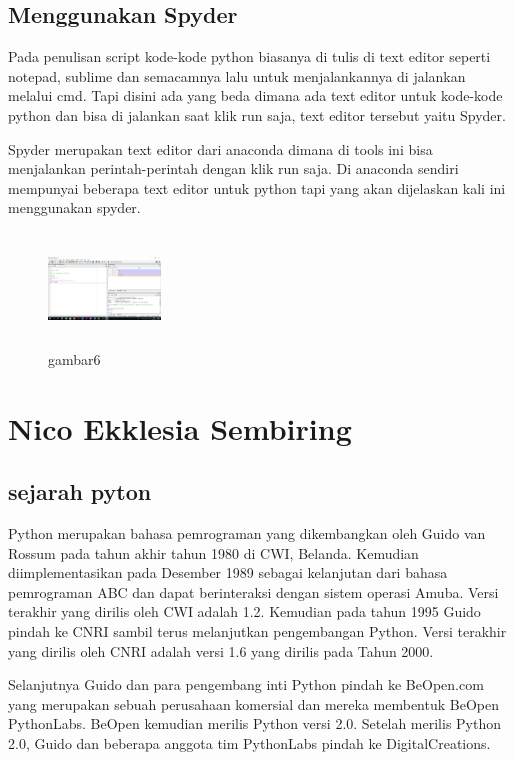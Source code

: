 \subsection{Menggunakan Spyder}
Pada penulisan script kode-kode python biasanya di tulis di text editor seperti notepad, sublime dan semacamnya lalu untuk menjalankannya di jalankan melalui cmd. Tapi disini ada yang beda dimana ada text editor untuk kode-kode python dan bisa di jalankan saat klik run saja, text editor tersebut yaitu Spyder.
\par Spyder merupakan text editor dari anaconda dimana di tools ini bisa menjalankan perintah-perintah dengan klik run saja. Di anaconda sendiri mempunyai beberapa text editor untuk python tapi yang akan dijelaskan kali ini menggunakan spyder.
\begin{figure}[!htbp]
    \centering
    \includegraphics[width=3cm,height=3cm]{figures/choi/6.png}
    \caption{gambar6}
    \label{spyder}
    \end{figure}
	



\section{Nico Ekklesia Sembiring}
\subsection{sejarah pyton}
Python merupakan bahasa pemrograman yang dikembangkan oleh Guido van Rossum pada tahun akhir tahun 1980 di CWI, Belanda. Kemudian diimplementasikan pada Desember 1989 sebagai kelanjutan dari bahasa pemrograman ABC dan dapat berinteraksi dengan sistem operasi Amuba. Versi terakhir yang dirilis oleh CWI adalah 1.2. Kemudian pada tahun 1995 Guido pindah ke CNRI sambil terus melanjutkan pengembangan Python. Versi terakhir yang dirilis oleh CNRI adalah versi 1.6 yang dirilis pada Tahun 2000.

Selanjutnya Guido dan para pengembang inti Python pindah ke BeOpen.com yang merupakan sebuah perusahaan komersial dan mereka membentuk BeOpen PythonLabs. BeOpen kemudian merilis Python versi 2.0. Setelah merilis Python 2.0, Guido dan beberapa anggota tim PythonLabs pindah ke DigitalCreations.

